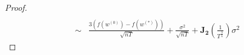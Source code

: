 \documentclass{article}
\begin{document}
\begin{proof}
\begin{align*}
  \\\sim & \frac{3(f(w^{(0)})-f(w^{(*)}))}{\sqrt{nT}}+\frac{\sigma^2}{\sqrt{nT}}+\mathbf{J_2}(\frac{1}{T^{\frac{3}{4}}})\sigma^2
  \end{align*}
\end{proof}
\end{document}
